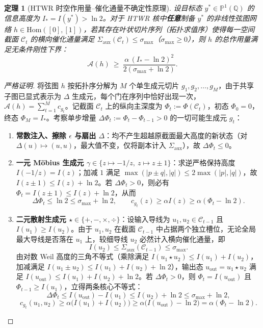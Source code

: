 \documentclass[11pt,a4paper]{ctexart}
\theoremstyle{plain}
\newtheorem{theorem}{定理}[section]
\theoremstyle{definition}
\newcommand{\PP}{\mathbb{P}}
\newcommand{\QQ}{\mathbb{Q}}
\newcommand{\cA}{\mathcal{A}}
\newcommand{\cC}{\mathcal{C}}
\newcommand{\Saux}{\Sigma_{\mathrm{aux}}}
\newcommand{\Hom}{\mathrm{Hom}}
\newcommand{\abs}[1]{\lvert #1 \rvert}
\begin{document}
\begin{theorem}[HTWR 时空作用量--催化通量不确定性原理]\label{thm:uncertainty}
设目标态 $y^* \in \PP^1(\QQ)$ 的信息高度为 $I_* = I(y^*) > \ln 2$。对于 HTWR 核中\textbf{任意}制备 $y^*$ 的非线性弦图网络 $h \in \Hom([0], [1])$，若其存在叶状切片序列（拓扑求值序）使得每一空间截面 $\cC_t$ 的横向催化通量满足 $\Saux(\cC_t) \le \sigma_{\max}$（$\sigma_{\max} \ge 0$），则 $h$ 的总作用量满足无条件刚性下界：
\[
\cA(h) \ \ge\ \frac{\alpha\,(I_* - \ln 2)^2}{2(\sigma_{\max} + \ln 2)} .
\]
\end{theorem}

\begin{proof}[严格证明]
将弦图 $h$ 按拓扑序分解为 $M$ 个单生成元切片 $g_1, g_2, \dots, g_M$，由于共享子图已显式表示为 $\Delta$ 生成元，每个门在序列中恰好出现一次，$\cA(h) = \sum_{t=1}^{M} c_{g_t}$。记截面 $\cC_t$ 上的纵向主深度为 $\Phi_t := \Phi(\cC_t)$，初态 $\Phi_0 = 0$，终态 $\Phi_M = I_*$。考察单步增量 $\Delta \Phi_t := \Phi_t - \Phi_{t-1} > 0$ 的一切可能生成元 $g_t$：

\begin{enumerate}
\item \textbf{常数注入、擦除 $\epsilon$ 与扇出 $\Delta$}：均不产生超越原截面最大高度的新状态（对 $\Delta(u) \mapsto (u,u)$，最大值不变，仅将副本计入 $\Saux$），故 $\Delta \Phi_t \le 0$。

\item \textbf{一元 Möbius 生成元 $\gamma \in \{z \mapsto -1/z,\ z \mapsto z \pm 1\}$}：求逆严格保持高度 $I(-1/z) = I(z)$；加减 $1$ 满足 $\max(\abs{p \pm q}, \abs{q}) \le 2\max(\abs{p}, \abs{q})$，故 $I(z \pm 1) \le I(z) + \ln 2$。若 $\Delta \Phi_t > 0$，则必有 $\Phi_t = I(z \pm 1) \le I(z) + \ln 2$，从而
\[
\Delta \Phi_t \le \ln 2 \le \sigma_{\max} + \ln 2,
\qquad
c_{g_t}(z) \ge \alpha I(z) \ge \alpha(\Phi_t - \ln 2).
\]

\item \textbf{二元散射生成元 $\star \in \{+, -, \times, \div\}$}：设输入导线为 $u_1, u_2 \in \cC_{t-1}$ 且 $I(u_1) \ge I(u_2)$。由于 $u_1, u_2$ 在截面 $\cC_{t-1}$ 中占据两个独立槽位，无论全局最大导线是否落在 $u_1$ 上，较细导线 $u_2$ 必然计入横向催化通量，即
\[
I(u_2) \le \Saux(\cC_{t-1}) \le \sigma_{\max}.
\]
由对数 Weil 高度的三角不等式（乘除满足 $I(u_1 \star u_2) \le I(u_1) + I(u_2)$，加减满足 $I(u_1 \pm u_2) \le I(u_1) + I(u_2) + \ln 2$），输出态 $u_{\mathrm{out}} = u_1 \star u_2$ 满足 $I(u_{\mathrm{out}}) \le I(u_1) + I(u_2) + \ln 2$。若 $\Delta \Phi_t > 0$，则 $\Phi_t = I(u_{\mathrm{out}})$ 且 $\Phi_{t-1} \ge I(u_1)$，立得两条核心不等式：
\[
\Delta \Phi_t \le I(u_{\mathrm{out}}) - I(u_1) \le I(u_2) + \ln 2 \le \sigma_{\max} + \ln 2,
\]
\[
c_{g_t}(u_1, u_2) \ge \alpha\bigl(I(u_1) + I(u_2)\bigr) \ge \alpha\bigl(I(u_{\mathrm{out}}) - \ln 2\bigr) = \alpha(\Phi_t - \ln 2).
\]
\end{enumerate}


\end{proof}
\end{document}

